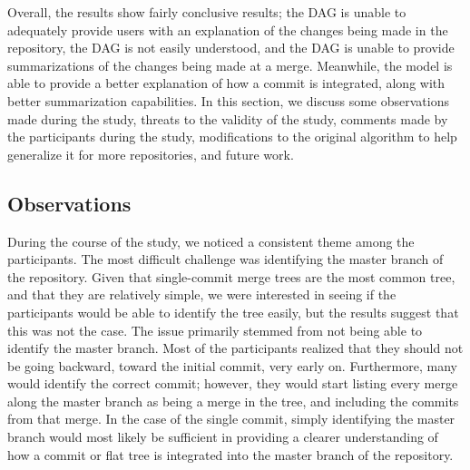 

Overall, the results show fairly conclusive results; the DAG is unable
to adequately provide users with an explanation of the changes being
made in the repository, the DAG is not easily understood, and the DAG is
unable to provide summarizations of the changes being made at a merge.
Meanwhile, the \mt model is able to provide a better explanation of how
a commit is integrated, along with better summarization capabilities. In
this section, we discuss some observations made during the study,
threats to the validity of the study, comments made by the participants
during the study, modifications to the original algorithm to help
generalize it for more repositories, and future work.

\subsection{Observations}
\label{sub:observations}



During the course of the study, we noticed a consistent theme among the
participants. The most difficult challenge was identifying the master
branch of the repository. Given that single-commit merge trees are the
most common tree, and that they are relatively simple, we were
interested in seeing if the participants would be able to identify the
tree easily, but the results suggest that this was not the case.
The
issue primarily stemmed from not being able to identify the master
branch. Most of the participants realized that they should not be going
backward, toward the initial commit, very early on. Furthermore, many
would identify the correct commit; however, they would start listing
every merge along the master branch as being a merge in the tree, and
including the commits from that merge. In the case of the single commit,
simply identifying the master branch would most likely be sufficient in
providing a clearer understanding of how a commit or flat tree is
integrated into the master branch of the repository.

